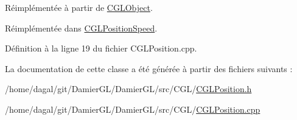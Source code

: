 Réimplémentée à partir de \hyperlink{class_c_g_l_object_a2781ec98c37bd209f2382c5130a365b9}{C\-G\-L\-Object}.



Réimplémentée dans \hyperlink{class_c_g_l_position_speed_ac2a548b1df4418be822a62d623fdd1ec}{C\-G\-L\-Position\-Speed}.



Définition à la ligne 19 du fichier C\-G\-L\-Position.\-cpp.



La documentation de cette classe a été générée à partir des fichiers suivants \-:\begin{DoxyCompactItemize}
\item 
/home/dagal/git/\-Damier\-G\-L/\-Damier\-G\-L/src/\-C\-G\-L/\hyperlink{_c_g_l_position_8h}{C\-G\-L\-Position.\-h}\item 
/home/dagal/git/\-Damier\-G\-L/\-Damier\-G\-L/src/\-C\-G\-L/\hyperlink{_c_g_l_position_8cpp}{C\-G\-L\-Position.\-cpp}\end{DoxyCompactItemize}
